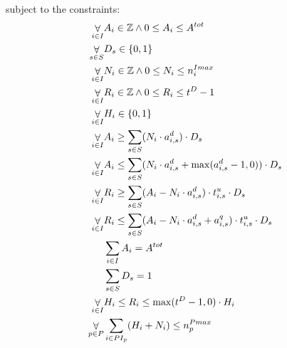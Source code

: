 {  subject to the constraints:
  \nopagebreak 
  \begin{align}
     \label{bot:cSolutionConstraintsBegin}\mathop\forall\limits_{i \in \INSTANCE} & \TaskAssignment_i \in \mathbb{Z} \land 0 \leq \TaskAssignment_i \leq \totalTasks  \\
     \mathop\forall\limits_{s \in \STORAGE}  & \DataAssignment_s \in \{0, 1\} \\ 
     \mathop\forall\limits_{i \in \INSTANCE} & \NumberInstances_i \in \mathbb{Z} \land 0 \leq \NumberInstances_i \leq \instanceMaxMachines_i \\
     \mathop\forall\limits_{i \in \INSTANCE} & \TailTaskHours_i \in \mathbb{Z} \land 0 \leq \TailTaskHours_i \leq \deadline - 1 \\
     \label{bot:cSolutionConstraintsEnd}\mathop\forall\limits_{i \in \INSTANCE} & \HasTail_i \in \{0, 1\} \\
     \label{bot:cTaskAssignmentBounds}\mathop\forall\limits_{i \in \INSTANCE}
          & \TaskAssignment_i \geq \sum_{s \in \STORAGE} (\NumberInstances_i \cdot
          \tasksPerDeadline_{i,s}) \cdot \DataAssignment_s
          \\
      \label{bot:cTaskAssignmentBounds2}\mathop\forall\limits_{i \in \INSTANCE}
          & \TaskAssignment_i \leq  \sum_{s \in \STORAGE} (\NumberInstances_i \cdot
          \tasksPerDeadline_{i,s} + \max(\tasksPerDeadline_{i,s} - 1, 0)) \cdot
          \DataAssignment_s\\
     \label{bot:cTailTasksHoursBounds}\mathop\forall\limits_{i \in \INSTANCE}
          & \TailTaskHours_i \geq \sum_{s \in \STORAGE} (\TaskAssignment_i - \NumberInstances_i \cdot
          \tasksPerDeadline_{i,s}) \cdot \unitTime_{i,s} \cdot \DataAssignment_s
          \\ 
     \label{bot:cTailTasksHoursBounds2}\mathop\forall\limits_{i \in \INSTANCE}
          & \TailTaskHours_i  \leq \sum_{s \in \STORAGE} (\TaskAssignment_i -
          \NumberInstances_i \cdot \tasksPerDeadline_{i,s} +
          \tasksPerTimeQuantum_{i,s}) \cdot \unitTime_{i,s} \cdot
          \DataAssignment_s\\ 
     \label{bot:cSumTasks}& \sum\limits_{i \in \INSTANCE} \TaskAssignment_i = \totalTasks \\
     \label{bot:cData}& \sum\limits_{s \in \STORAGE} \DataAssignment_s = 1 \\ 
     \label{bot:cSetHasTailBounds}\mathop\forall\limits_{i \in \INSTANCE} &
     \HasTail_i \leq \TailTaskHours_i \leq \max(\deadline-1,0)\cdot\HasTail_i
     \\ \label{bot:cMaxMachines}\mathop\forall\limits_{p \in \PROVIDER} & \sum_{i \in \PROVIDERINSTANCES_p} (\HasTail_i + \NumberInstances_i) \leq \providerMaxMachines_p
  \end{align}

}
